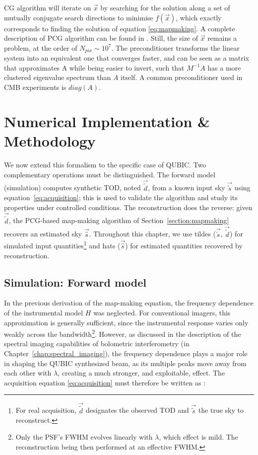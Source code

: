 \documentclass[../../thesis.tex]{subfiles}
\begin{document}
CG algorithm will iterate on $\vec{x}$ by searching for the solution along a set of mutually conjugate search directions to minimise $f(\vec{x})$, which exactly corresponds to finding the solution of equation \ref{eq:mapmaking}. A complete description of PCG algorithm can be found in \cite{shewchuk1994}. Still, the size of $\vec{x}$ remains a problem, at the order of $N_{pix} \sim 10^7$. The preconditioner transforms the linear system into an equivalent one that converges faster, and can be seen as a matrix that approximates A while being easier to invert, such that $M^{-1}A$ has a more clustered eigenvalue spectrum than $A$ itself. A common preconditioner used in CMB experiments is $diag(A)$. 

\section{Numerical Implementation \& Methodology}

We now extend this formalism to the specific case of QUBIC. Two complementary operations must be distinguished. The forward model (simulation) computes synthetic TOD, noted $\vec{\tilde{d}}$, from a known input sky $\vec{\tilde{s}}$ using equation~\ref{eq:acquisition}; this is used to validate the algorithm and study its properties under controlled conditions. The reconstruction does the reverse: given $\vec{\tilde{d}}$, the PCG-based map-making algorithm of Section~\ref{section:mapmaking} recovers an estimated sky $\vec{\hat{s}}$. Throughout this chapter, we use tildes ($\vec{\tilde{s}}$, $\vec{\tilde{d}}$) for simulated input quantities\footnote{For real acquisition, $\vec{\tilde{d}}$ designates the observed TOD and $\vec{\tilde{s}}$ the true sky to reconstruct.} and hats ($\vec{\hat{s}}$) for estimated quantities recovered by reconstruction. 

\subsection{Simulation: Forward model}

In the previous derivation of the map-making equation, the frequency dependence of the instrumental model $H$ was neglected. For conventional imagers, this approximation is generally sufficient, since the instrumental response varies only weakly across the bandwidth\footnote{Only the PSF's FWHM evolves linearly with $\lambda$, which effect is mild. The reconstruction being then performed at an effective FWHM.}. However, as discussed in the description of the spectral imaging capabilities of bolometric interferometry (in Chapter~\ref{chap:spectral_imaging}), the frequency dependence plays a major role in shaping the QUBIC synthesized beam, as its multiple peaks move away from each other with $\lambda$, creating a much stronger, and exploitable, effect. The acquisition equation \ref{eq:acquisition} must therefore be written as : 
\end{document}
